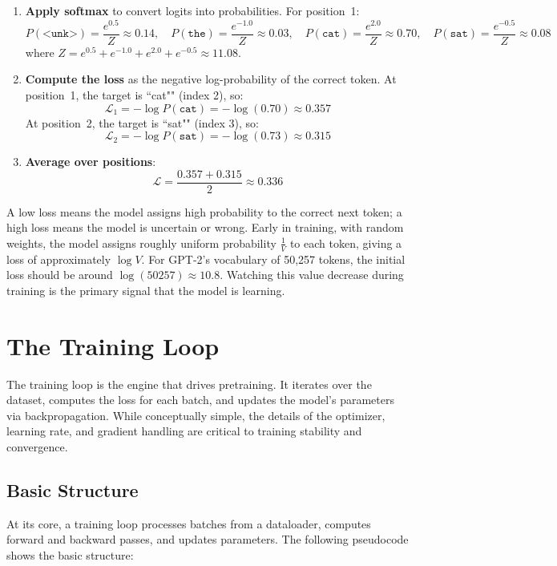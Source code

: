 \begin{enumerate}
  \item \textbf{Apply softmax} to convert logits into probabilities. For position~1:
  \[
    P(\texttt{<unk>}) = \frac{e^{0.5}}{Z} \approx 0.14, \quad
    P(\texttt{the})  = \frac{e^{-1.0}}{Z} \approx 0.03, \quad
    P(\texttt{cat})  = \frac{e^{2.0}}{Z} \approx 0.70, \quad
    P(\texttt{sat})  = \frac{e^{-0.5}}{Z} \approx 0.08
  \]
  where $Z = e^{0.5} + e^{-1.0} + e^{2.0} + e^{-0.5} \approx 11.08$.

  \item \textbf{Compute the loss} as the negative log-probability of the correct token. At position~1, the target is ``cat"" (index 2), so:
  \[
    \mathcal{L}_1 = -\log P(\texttt{cat}) = -\log(0.70) \approx 0.357
  \]
  At position~2, the target is ``sat"" (index 3), so:
  \[
    \mathcal{L}_2 = -\log P(\texttt{sat}) = -\log(0.73) \approx 0.315
  \]

  \item \textbf{Average over positions}:
  \[
    \mathcal{L} = \frac{0.357 + 0.315}{2} \approx 0.336
  \]
\end{enumerate}

A low loss means the model assigns high probability to the correct next token; a high loss means the model is uncertain or wrong. Early in training, with random weights, the model assigns roughly uniform probability $\frac{1}{V}$ to each token, giving a loss of approximately $\log V$. For GPT-2's vocabulary of 50,257 tokens, the initial loss should be around $\log(50257) \approx 10.8$. Watching this value decrease during training is the primary signal that the model is learning.

\section{The Training Loop}

The training loop is the engine that drives pretraining. It iterates over the dataset, computes the loss for each batch, and updates the model's parameters via backpropagation. While conceptually simple, the details of the optimizer, learning rate, and gradient handling are critical to training stability and convergence.

\subsection{Basic Structure}

At its core, a training loop processes batches from a dataloader, computes forward and backward passes, and updates parameters. The following pseudocode shows the basic structure:

